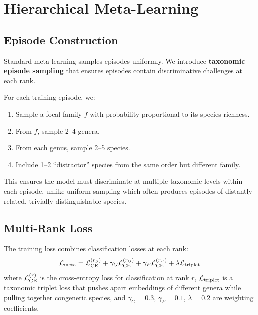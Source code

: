 \section{Hierarchical Meta-Learning}

\label{sec:metalearning}

\subsection{Episode Construction}

Standard meta-learning samples episodes uniformly. We introduce
\textbf{taxonomic episode sampling} that ensures episodes contain
discriminative challenges at each rank.

For each training episode, we:
\begin{enumerate}
  \item Sample a focal family $f$ with probability proportional to its
    species richness.
  \item From $f$, sample 2--4 genera.
  \item From each genus, sample 2--5 species.
  \item Include 1--2 ``distractor'' species from the same order but
    different family.
\end{enumerate}

This ensures the model must discriminate at multiple taxonomic levels
within each episode, unlike uniform sampling which often produces
episodes of distantly related, trivially distinguishable species.

\subsection{Multi-Rank Loss}

The training loss combines classification losses at each rank:
\begin{equation}
  \mathcal{L}_{\text{meta}} = \mathcal{L}_{\text{CE}}^{(r_S)} + \gamma_G
  \mathcal{L}_{\text{CE}}^{(r_G)} + \gamma_F \mathcal{L}_{\text{CE}}^{(r_F)}
  + \lambda \mathcal{L}_{\text{triplet}}
\end{equation}
where $\mathcal{L}_{\text{CE}}^{(r)}$ is the cross-entropy loss for
classification at rank $r$, $\mathcal{L}_{\text{triplet}}$ is a taxonomic
triplet loss that pushes apart embeddings of different genera while
pulling together congeneric species, and $\gamma_G = 0.3$, $\gamma_F =
0.1$, $\lambda = 0.2$ are weighting coefficients.

